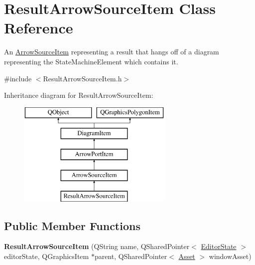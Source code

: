 \hypertarget{class_result_arrow_source_item}{\section{Result\-Arrow\-Source\-Item Class Reference}
\label{class_result_arrow_source_item}
}


An \hyperlink{class_arrow_source_item}{Arrow\-Source\-Item} representing a result that hangs off of a diagram representing the State\-Machine\-Element which contains it.  




{\ttfamily \#include $<$Result\-Arrow\-Source\-Item.\-h$>$}

Inheritance diagram for Result\-Arrow\-Source\-Item\-:\begin{figure}[H]
\begin{center}
\leavevmode
\includegraphics[height=5.000000cm]{class_result_arrow_source_item}
\end{center}
\end{figure}
\subsection*{Public Member Functions}
\begin{DoxyCompactItemize}
\item 
\hypertarget{class_result_arrow_source_item_a3735a1700541f7da855b6f2347b7bdd5}{{\bfseries Result\-Arrow\-Source\-Item} (Q\-String name, Q\-Shared\-Pointer$<$ \hyperlink{class_editor_state}{Editor\-State} $>$ editor\-State, Q\-Graphics\-Item $\ast$parent, Q\-Shared\-Pointer$<$ \hyperlink{class_picto_1_1_asset}{Asset} $>$ window\-Asset)}\label{class_result_arrow_source_item_a3735a1700541f7da855b6f2347b7bdd5}

\end{DoxyCompactItemize}
